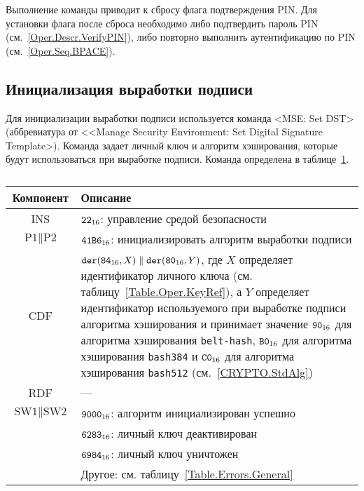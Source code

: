 Выполнение команды приводит к сбросу флага подтверждения PIN.
Для установки флага после сброса необходимо либо подтвердить пароль PIN 
(см.~\ref{Oper.Descr.VerifyPIN}), либо повторно выполнить аутентификацию по PIN 
(см.~\ref{Oper.Seq.BPACE}). 


\subsection{Инициализация выработки подписи}
\label{Oper.Descr.SetDST}

Для инициализации выработки подписи используется команда     
<MSE: Set DST> (аббревиатура от <<Manage Security Environment: Set 
Digital Signature Template>). Команда задает личный ключ и алгоритм
хэширования, которые будут использоваться при выработке подписи.
%
Команда определена в таблице~\ref{Table.Oper.SetDSTCmd}.

\begin{table}[hbt]
\caption{}\label{Table.Oper.SetDSTCmd}
\begin{tabular}{|c|p{14cm}|}
\hline
Компонент & Описание \\
\hline
\hline
INS & $\texttt{22}_{16}$: управление средой безопасности\\ 
\hline
$\text{P1} \parallel\text{P2}$ & $\texttt{41B6}_{16}$: 
инициализировать алгоритм выработки подписи \\
\hline
CDF & 
$\texttt{der}(\texttt{84}_{16}, X) \parallel \texttt{der}(\texttt{80}_{16}, Y)$, 
где $X$ определяет идентификатор личного ключа (см. таблицу~\ref{Table.Oper.KeyRef}), 
а $Y$ определяет идентификатор используемого при выработке
подписи алгоритма хэширования 
и принимает значение $\texttt{90}_{16}$ для алгоритма хэширования \texttt{belt-hash},  
$\texttt{B0}_{16}$ для алгоритма хэширования \texttt{bash384} и 
$\texttt{C0}_{16}$ для алгоритма хэширования \texttt{bash512} (см.~\ref{CRYPTO.StdAlg})\\
\hline 
\hline
RDF &  --- \\
\hline
$\text{SW1} \parallel \text{SW2}$ & 
$\texttt{9000}_{16}$: алгоритм инициализирован успешно \\
\cline{2-2}
  & $\texttt{6283}_{16}$: личный ключ деактивирован \\
\cline{2-2}
  & $\texttt{6984}_{16}$: личный ключ уничтожен \\
\cline{2-2}
  & Другое: см. таблицу~\ref{Table.Errors.General} \\
\hline
\end{tabular}
\end{table}

